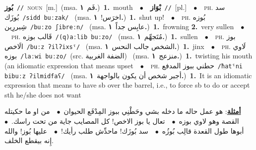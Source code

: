 \documentclass[10pt,a4paper,twoside]{article} %
\begin{document}
\begin{multicols}{2}
{\setlength\topsep{0pt}\textbf{\foreignlanguage{arabic}{بُوز}}\ {\color{gray}\texttt{//}\color{black}}\ \textsc{noun}\ [m.]\ \color{gray}(msa. \foreignlanguage{arabic}{فَم}~\foreignlanguage{arabic}{\textbf{١.}})\color{black}\ \textbf{1.}~mouth\ \ $\bullet$\ \ \setlength\topsep{0pt}\textbf{\foreignlanguage{arabic}{بْوَاز}}\ {\color{gray}\texttt{//}\color{black}}\ [pl.]\ \ $\bullet$\ \ \textsc{ph.} \color{gray} \foreignlanguage{arabic}{سد بُوزَك}\color{black}\ {\color{gray}\texttt{/{\sffamily sidd buːzak}/}\color{black}}\ \color{gray} (msa. \foreignlanguage{arabic}{اخرَس!}~\foreignlanguage{arabic}{\textbf{١.}})\color{black}\ \textbf{1.}~shut up!\ \ $\bullet$\ \ \textsc{ph.} \color{gray} \foreignlanguage{arabic}{بُوزه شِبررِين}\color{black}\ {\color{gray}\texttt{/{\sffamily buːzo ʃibreːn}/}\color{black}}\ \color{gray} (msa. \foreignlanguage{arabic}{عابِس جداً}~\foreignlanguage{arabic}{\textbf{١.}})\color{black}\ \textbf{1.}~frowning  \textbf{2.}~very sullen\ \ $\bullet$\ \ \textsc{ph.} \color{gray} \foreignlanguage{arabic}{قَالب بوزه}\color{black}\ {\color{gray}\texttt{/{\sffamily (q)aːlib buːzo}/}\color{black}}\ \color{gray} (msa. \foreignlanguage{arabic}{مُتَجهِّم}~\foreignlanguage{arabic}{\textbf{١.}})\color{black}\ \textbf{1.}~sullen\ \ $\bullet$\ \ \textsc{ph.} \color{gray} \foreignlanguage{arabic}{بوز الَاخص}\color{black}\ {\color{gray}\texttt{/{\sffamily buːz ʔilʔixsˤ}/}\color{black}}\ \color{gray} (msa. \foreignlanguage{arabic}{الشخص جالب النحس}~\foreignlanguage{arabic}{\textbf{١.}})\color{black}\ \textbf{1.}~jinx\ \ $\bullet$\ \ \textsc{ph.} \color{gray} \foreignlanguage{arabic}{لَاوي بوزه}\color{black}\ {\color{gray}\texttt{/{\sffamily laːwi buːzo}/}\color{black}}\ \color{gray}(src. \foreignlanguage{arabic}{الضفة الغربية})\color{black}\ \color{gray} (msa. \foreignlanguage{arabic}{منزعج}~\foreignlanguage{arabic}{\textbf{١.}})\color{black}\ \textbf{1.}~twisting his mouth (an idiomatic expression that means upset\ \ $\bullet$\ \ \textsc{ph.} \color{gray} \foreignlanguage{arabic}{حطني ببوز المدفع}\color{black}\ {\color{gray}\texttt{/{\sffamily ħatˤni bibuːz ʔilmidfaʕ}/}\color{black}}\ \color{gray} (msa. \foreignlanguage{arabic}{أجبر شخص أن يكون بالواجهة}~\foreignlanguage{arabic}{\textbf{١.}})\color{black}\ \textbf{1.}~It is an idiomatic expression that means to have sb over the barrel, i.e., to force sb to do or accept sth he/she does not want\  \begin{flushright}\color{gray}\foreignlanguage{arabic}{\textbf{\underline{\foreignlanguage{arabic}{أمثلة}}}: هو عمل حاله ما دخله بشي وحَطْنِي ببوز المِدْفَع الحيوان\ $\bullet$\ \  من او ما حكيتله القصة وهو لاوي بوزه\ $\bullet$\ \  تعال يا بوز الاخص! كل المصايب جاية من تحت راسك.\ $\bullet$\ \  أبوها طول القعدة قالِب بُوزُه\ $\bullet$\ \  سد بُوزَك! ماحدِّش طلب رأيك!\ $\bullet$\ \  عليها بُوز! والله إِنه بيقطع الخلف.}\end{flushright}\color{black}} \vspace{2mm}


\end{multicols}
\end{document}
